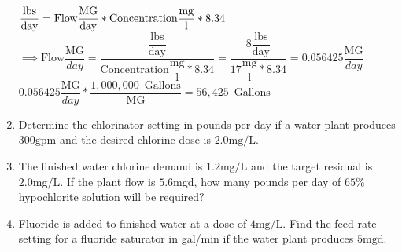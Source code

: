 \documentclass{article}
\begin{document}
\begin{enumerate}
\begin{figure}[h!]
\end{figure}
$\dfrac{\mathrm{lbs}}{\mathrm{day}}=\mathrm{Flow}\dfrac{{\mathrm{MG}}}{\mathrm{day}}* \mathrm{Concentration}\dfrac{\mathrm{mg}}{\mathrm{l}}*8.34 \hspace{0.2cm}$\\
\vspace{0.2cm}
$\implies \mathrm{Flow}\dfrac{{\mathrm{MG}}}{day}=\dfrac{ \dfrac{\mathrm{lbs}}{\mathrm{day}}}{\mathrm{Concentration}\dfrac{\mathrm{mg}}{\mathrm{l}}*8.34}=\dfrac{8 \dfrac{\mathrm{lbs}}{\mathrm{day}}}{17\dfrac{\mathrm{mg}}{\mathrm{l}}*8.34}=0.056425\dfrac{{\mathrm{MG}}}{day}$\\
\vspace{0.2cm}
$0.056425\dfrac{{\mathrm{MG}}}{day}*\dfrac{1,000,000 \enspace \mathrm{Gallons}}{\mathrm{MG}}=\boxed{56,425 \enspace \mathrm{Gallons}}$
\vspace{0.2cm}
  \item Determine the chlorinator setting in pounds per day if a water plant produces $300 \mathrm{gpm}$ and the desired chlorine dose is $2.0 \mathrm{mg} / \mathrm{L}$.

  \item The finished water chlorine demand is $1.2 \mathrm{mg} / \mathrm{L}$ and the target residual is $2.0 \mathrm{mg} / \mathrm{L}$. If the plant flow is $5.6 \mathrm{mgd}$, how many pounds per day of $65 \%$ hypochlorite solution will be required?

  \item Fluoride is added to finished water at a dose of $4 \mathrm{mg} / \mathrm{L}$. Find the feed rate setting for a fluoride saturator in gal/min if the water plant produces $5 \mathrm{mgd}$.


\end{enumerate}
\end{document}
